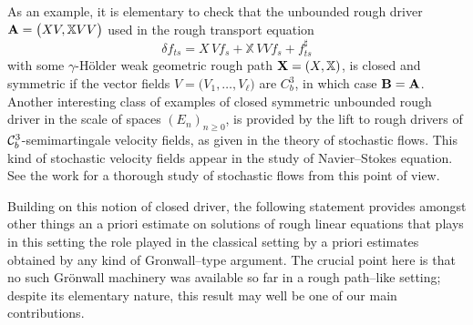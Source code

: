 \documentclass[11pt,a4paper]{amsart}
\newcommand{\bbX}{\mathbb{X}}
\renewcommand{\geq}{\geqslant}
\newcommand{\ssk}{\smallskip}
\numberwithin{equation}{section} %
\begin{document}
\smallskip

As an example, it is elementary to check that the unbounded rough driver ${\bfA} = \big(XV,\bbX VV\big)$ used in the rough transport equation
\begin{equation*}
\delta f_{ts} = X\,Vf_s +  \bbX\,V V f_s + f^\sharp_{ts}
\end{equation*}
with some $\gamma$-H\"older weak geometric rough path ${\bfX} = (X,\bbX)$, is closed and symmetric if the vector fields $V = \big(V_1,\dots,V_\ell\big)$ are $C^3_b$, in which case $\bf B = \bf A$. Another interesting class of examples of closed symmetric unbounded rough driver in the scale of spaces $(E_n)_{n\geq 0}$, is provided by the lift to rough drivers of $\mathcal{C}^3_b$-semimartingale velocity fields, as given in the theory of stochastic flows. This kind of stochastic velocity fields appear in the study of Navier--Stokes equation. See the work \cite{BailleulRiedel} for a thorough study of stochastic flows from this point of view. 

\medskip

Building on this notion of closed driver, the following statement provides amongst other things an a priori estimate on solutions of rough linear equations that plays in this setting the role played in the classical setting by a priori estimates obtained by any kind of Gronwall--type argument. The crucial point here is that no such Gr\"onwall machinery was available so far in a rough path--like setting; despite its elementary nature, this result may well be one of our main contributions. 

\ssk
\end{document}
